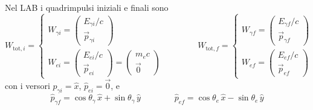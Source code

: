 Nel LAB i quadrimpulsi iniziali e finali sono
\begin{equation*}
    W_{\text{tot},i} =
    \begin{cases}
        W_{\gamma i} = \begin{pmatrix} E_{\gamma i}/c \\ \vec{p}_{\gamma i} \end{pmatrix} \\[10pt]
        W_{e i} = \begin{pmatrix} E_{e i}/c \\ \vec{p}_{e i} \end{pmatrix} = \begin{pmatrix} m_e c \\ \vec{0} \end{pmatrix}
    \end{cases}
    \qquad\qquad
    W_{\text{tot},f} =
    \begin{cases}
        W_{\gamma f} = \begin{pmatrix} E_{\gamma f}/c \\ \vec{p}_{\gamma f} \end{pmatrix} \\[10pt]
        W_{e f} = \begin{pmatrix} E_{e f}/c \\ \vec{p}_{e f} \end{pmatrix}
    \end{cases}
\end{equation*}
con i versori $\hat{p}_{\gamma i} = \hat{x}$, $\hat{p}_{e i} = \vec{0}$, e
\begin{equation*}
    \hat{p}_{\gamma f} = \cos\theta_{\gamma}\,\hat{x} + \sin\theta_{\gamma}\,\hat{y}
    \qquad\qquad
    \hat{p}_{e f} = \cos\theta_{e}\,\hat{x} - \sin\theta_{e}\,\hat{y}
\end{equation*}

